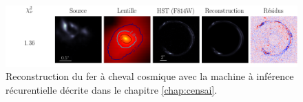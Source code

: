 \begin{figure}[H]
        \centering
        \includegraphics[width=\textwidth]{figures/horseshoe_pred2}
        \caption{Reconstruction du fer à cheval cosmique avec la machine à inférence récurentielle 
        décrite dans le chapitre \ref{chap:censai}.}
        \label{fig:horseshoe}
\end{figure}

